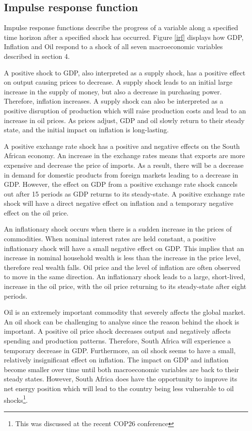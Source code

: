 \documentclass[11pt,preprint, authoryear]{elsarticle}
\numberwithin{equation}{section}
\numberwithin{figure}{section}
\numberwithin{table}{section}
\let\rmarkdownfootnote\footnote%
\def\footnote{\protect\rmarkdownfootnote}
\begin{document}
\newpage

\hypertarget{impulse-response-function}{%
\subsection{Impulse response function}\label{impulse-response-function}}

Impulse response functions describe the progress of a variable along a
specified time horizon after a specified shock has occurred. Figure
\ref{irf} displays how GDP, Inflation and Oil respond to a shock of all
seven macroeconomic variables described in section 4.

A positive shock to GDP, also interpreted as a supply shock, has a
positive effect on output causing prices to decrease. A supply shock
leads to an initial large increase in the supply of money, but also a
decrease in purchasing power. Therefore, inflation increases. A supply
shock can also be interpreted as a positive disruption of production
which will raise production costs and lead to an increase in oil prices.
As prices adjust, GDP and oil slowly return to their steady state, and
the initial impact on inflation is long-lasting.

A positive exchange rate shock has a positive and negative effects on
the South African economy. An increase in the exchange rates means that
exports are more expensive and decrease the price of imports. As a
result, there will be a decrease in demand for domestic products from
foreign markets leading to a decrease in GDP. However, the effect on GDP
from a positive exchange rate shock cancels out after 15 periods as GDP
returns to its steady-state. A positive exchange rate shock will have a
direct negative effect on inflation and a temporary negative effect on
the oil price.

An inflationary shock occurs when there is a sudden increase in the
prices of commodities. When nominal interest rates are held constant, a
positive inflationary shock will have a small negative effect on GDP.
This implies that an increase in nominal household wealth is less than
the increase in the price level, therefore real wealth falls. Oil price
and the level of inflation are often observed to move in the same
direction. An inflationary shock leads to a large, short-lived, increase
in the oil price, with the oil price returning to its steady-state after
eight periods.

Oil is an extremely important commodity that severely affects the global
market. An oil shock can be challenging to analyse since the reason
behind the shock is important. A positive oil price shock decreases
output and negatively affects spending and production patterns.
Therefore, South Africa will experience a temporary decrease in GDP.
Furthermore, an oil shock seems to have a small, relatively
insignificant effect on inflation. The impact on GDP and inflation
become smaller over time until both macroeconomic variables are back to
their steady states. However, South Africa does have the opportunity to
improve its net energy position which will lead to the country being
less vulnerable to oil
shocks\footnote{This was discussed at the recent COP26 conference}.
\end{document}
